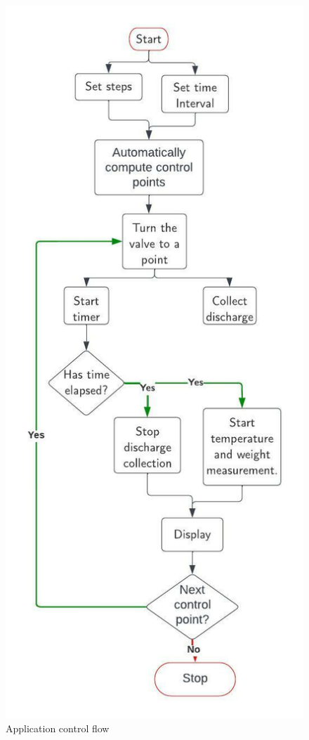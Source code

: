 \begin{itemize}
     \begin{figure}[H]
         \centering
         \includegraphics{Figures/Control flow.jpeg}
         \caption{Application control flow}
         \label{fig:control_flow}
     \end{figure}
     
\end{itemize}

